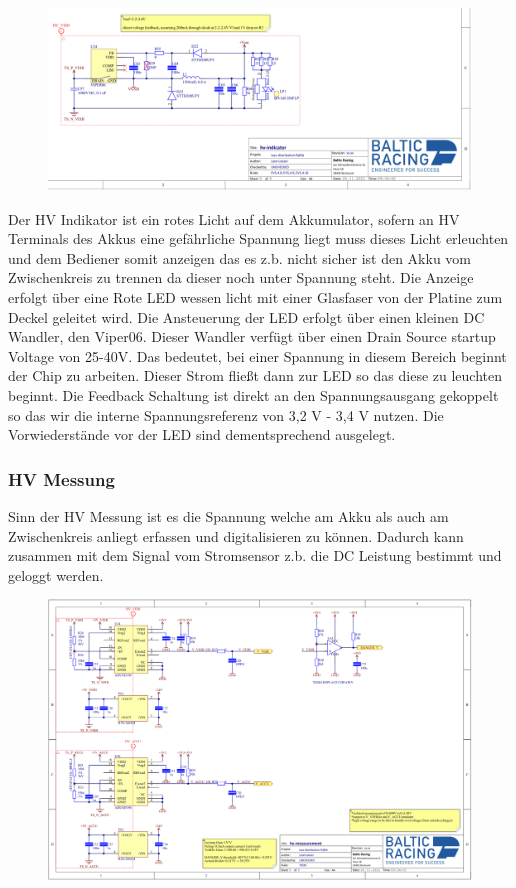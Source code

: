 \begin{figure}
	\centering
	\includegraphics[width=0.7\linewidth]{bilder/HV_indicator_schematic}
	\caption{}
	\label{fig:hvindicatorschematic}
\end{figure}

Der HV Indikator ist ein rotes Licht auf dem Akkumulator, sofern an HV Terminals des Akkus eine gefährliche Spannung liegt muss dieses Licht erleuchten und dem Bediener somit anzeigen das es z.b. nicht sicher ist den Akku vom Zwischenkreis zu trennen da dieser noch unter Spannung steht. Die Anzeige erfolgt über eine Rote LED wessen licht mit einer Glasfaser von der Platine zum Deckel geleitet wird. Die Ansteuerung der LED erfolgt über einen kleinen DC Wandler, den Viper06. Dieser Wandler verfügt über einen Drain Source startup Voltage von 25-40V. Das bedeutet, bei einer Spannung in diesem Bereich beginnt der Chip zu arbeiten. Dieser Strom fließt dann zur LED so das diese zu leuchten beginnt. Die Feedback Schaltung ist direkt an den Spannungsausgang gekoppelt so das wir die interne Spannungsreferenz von 3,2 V - 3,4 V nutzen. Die Vorwiederstände vor der LED sind dementsprechend ausgelegt.

\FloatBarrier
\subsubsection{HV Messung}
Sinn der HV Messung ist es die Spannung welche am Akku als auch am Zwischenkreis anliegt erfassen und digitalisieren zu können. Dadurch kann zusammen mit dem Signal vom Stromsensor z.b. die DC Leistung bestimmt und geloggt werden. 

\begin{figure}
	\centering
	\includegraphics[width=0.7\linewidth]{bilder/HV_Measurement_PNG}
	\caption{}
	\label{fig:hvmeasurementpng}
\end{figure}

